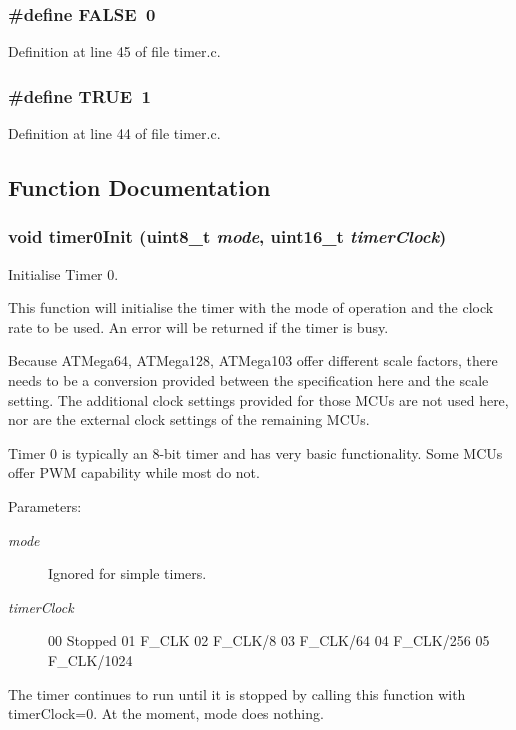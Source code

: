 \subsubsection{\setlength{\rightskip}{0pt plus 5cm}\#define FALSE~0}\label{timer_8c_a93f0eb578d23995850d61f7d61c55c1}




Definition at line 45 of file timer.c.
\subsubsection{\setlength{\rightskip}{0pt plus 5cm}\#define TRUE~1}\label{timer_8c_a8cecfc5c5c054d2875c03e77b7be15d}




Definition at line 44 of file timer.c.

\subsection{Function Documentation}
\subsubsection{\setlength{\rightskip}{0pt plus 5cm}void timer0Init (uint8\_\-t {\em mode}, uint16\_\-t {\em timerClock})}\label{timer_8c_37510ee4f2bf57f8916f3137bf7d4ebf}


Initialise Timer 0. 

This function will initialise the timer with the mode of operation and the clock rate to be used. An error will be returned if the timer is busy.

Because ATMega64, ATMega128, ATMega103 offer different scale factors, there needs to be a conversion provided between the specification here and the scale setting. The additional clock settings provided for those MCUs are not used here, nor are the external clock settings of the remaining MCUs.

Timer 0 is typically an 8-bit timer and has very basic functionality. Some MCUs offer PWM capability while most do not.

\begin{Desc}
\item[Parameters:]
\begin{description}
\item[{\em mode}]Ignored for simple timers. \item[{\em timerClock}]00 Stopped 01 F\_\-CLK 02 F\_\-CLK/8 03 F\_\-CLK/64 04 F\_\-CLK/256 05 F\_\-CLK/1024\end{description}
\end{Desc}
The timer continues to run until it is stopped by calling this function with timerClock=0. At the moment, mode does nothing. 

